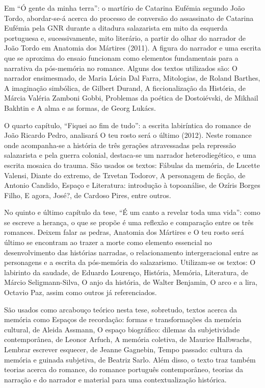 \documentclass[../DISSERTACAO_MAIN.tex]{subfiles}
\begin{document}
Em “Ó gente da minha terra”: o martírio de Catarina Eufémia segundo João Tordo, abordar-se-á acerca do processo de conversão do assassinato de Catarina Eufémia pela GNR durante a ditadura salazarista em mito da esquerda portuguesa e, sucessivamente, mito literário, a partir do olhar do narrador de João Tordo em Anatomia dos Mártires (2011). A figura do narrador e uma escrita que se aproxima do ensaio funcionam como elementos fundamentais para a narrativa da pós-memória no romance. Alguns dos textos utilizados são: O narrador ensimesmado, de Maria Lúcia Dal Farra, Mitologias, de Roland Barthes,  A imaginação simbólica, de Gilbert Durand, A ficcionalização da História, de Márcia Valéria Zamboni Gobbi, Problemas da poética de Dostoiévski, de Mikhail Bakhtin e A alma e as formas, de Georg Lukács. 

O quarto capítulo, “Fiquei ao fim de tudo”: a escrita labiríntica do romance de João Ricardo Pedro, analisará O teu rosto será o último (2012). Neste romance onde acompanha-se a história de três gerações atravessadas pela repressão salazarista e pela guerra colonial, destaca-se um narrador heterodiegético, e uma escrita mosaica do trauma. São usados os textos: Fábulas da memória, de Lucette Valensi, Diante do extremo, de Tzvetan Todorov, A personagem de ficção, de Antonio Candido,  Espaço e Literatura: introdução à topoanálise, de Ozíris Borges Filho, E agora, José?, de Cardoso Pires, entre outros.

No quinto e último capítulo da tese, “É um canto a revelar toda uma vida”: como se escreve a herança, o que se propõe é uma reflexão e comparação entre os três romances. Deixem falar as pedras, Anatomia dos Mártires e O teu rosto será  último se encontram ao trazer a morte como elemento essencial no desenvolvimento das histórias narradas, o relacionamento intergeracional entre as personagens e a escrita da pós-memória do salazarismo. Utilizam-se os textos: O labirinto da saudade, de Eduardo Lourenço, História, Memória, Literatura, de Márcio Seligmann-Silva, O anjo da história, de Walter Benjamin, O arco e a lira, Octavio Paz, assim como outros já referenciados. 

São usados como arcabouço teórico nesta tese, sobretudo, textos acerca da memória como Espaços de recordação: formas e transformações da memória cultural, de Aleida Assmann, O espaço biográfico: dilemas da subjetividade contemporânea, de Leonor Arfuch, A memória coletiva, de Maurice Halbwachs, Lembrar escrever esquecer, de Jeanne Gagnebin, Tempo passado: cultura da memória e guinada subjetiva, de Beatriz Sarlo. Além disso, o texto traz também teorias acerca do romance, do romance português contemporâneo, teorias da narração e do narrador e material para uma contextualização histórica.
\end{document}
